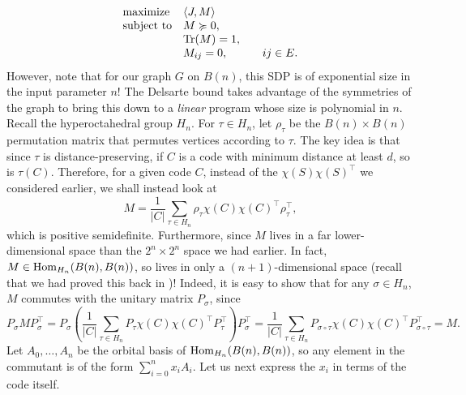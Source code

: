 	\begin{equation}
		\label{indep-sdp}
		\begin{array}{ll@{}ll}
		\text{maximize}  & \displaystyle  \langle J,M\rangle &\\
		\text{subject to} \displaystyle & M \pge 0, &\\
		& \displaystyle \Tr(M) = 1, & \\
		& M_{ij} = 0, & \qquad ij \in E.
		\end{array}
	\end{equation}
	However, note that for our graph $G$ on $B(n)$, this SDP is of exponential size in the input parameter $n$! The Delsarte bound takes advantage of the symmetries of the graph to bring this down to a \emph{linear} program whose size is polynomial in $n$.\\

	Recall the hyperoctahedral group $H_n$. For $\tau \in H_n$, let $\rho_\tau$ be the $B(n) \times B(n)$ permutation matrix that permutes vertices according to $\tau$. The key idea is that since $\tau$ is distance-preserving, if $C$ is a code with minimum distance at least $d$, so is $\tau(C)$. Therefore, for a given code $C$, instead of the $\chi(S) \chi(S)^\top$ we considered earlier, we shall instead look at
	\begin{equation}
		\label{eq:delsarte-key}
		M = \frac{1}{|C|} \sum_{\tau \in H_n} \rho_\tau \chi(C) \chi(C)^\top \rho_\tau^\top,
	\end{equation}
	which is positive semidefinite. Furthermore, since $M$ lives in a far lower-dimensional space than the $2^n \times 2^n$ space we had earlier. In fact, $M \in \operatorname{Hom}_{H_n}(B(n),B(n))$, so lives in only a $(n+1)$-dimensional space (recall that we had proved this back in )! Indeed, it is easy to show that for any $\sigma \in H_n$, $M$ commutes with the unitary matrix $P_\sigma$, since
	\begin{equation}
		\label{eq:1.4}
		P_\sigma M P_\sigma^\top = P_\sigma \left(\frac{1}{|C|} \sum_{\tau \in H_n} P_\tau \chi(C) \chi(C)^\top P_\tau^\top \right) P_\sigma^\top = \frac{1}{|C|} \sum_{\tau \in H_n} P_{\sigma \circ \tau} \chi(C) \chi(C)^\top P_{\sigma \circ \tau}^\top = M.
	\end{equation}
	Let $A_0,\ldots,A_n$ be the orbital basis of $\operatorname{Hom}_{H_n}(B(n),B(n))$, so any element in the commutant is of the form $\sum_{i=0}^n x_i A_i$. Let us next express the $x_i$ in terms of the code itself.

